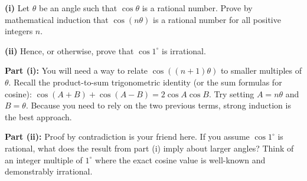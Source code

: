\begin{problem}
\textbf{(i)} Let $\theta$ be an angle such that $\cos \theta$ is a rational number. Prove by mathematical induction that $\cos(n\theta)$ is a rational number for all positive integers $n$.

\vspace{10pt}

\textbf{(ii)} Hence, or otherwise, prove that $\cos 1^\circ$ is irrational.
\end{problem}

\begin{hint}
\textbf{Part (i):} You will need a way to relate $\cos((n+1)\theta)$ to smaller multiples of $\theta$. Recall the product-to-sum trigonometric identity (or the sum formulas for cosine): $\cos(A+B) + \cos(A-B) = 2\cos A \cos B$. Try setting $A = n\theta$ and $B = \theta$. Because you need to rely on the two previous terms, strong induction is the best approach.

\textbf{Part (ii):} Proof by contradiction is your friend here. If you assume $\cos 1^\circ$ is rational, what does the result from part (i) imply about larger angles? Think of an integer multiple of $1^\circ$ where the exact cosine value is well-known and demonstrably irrational.
\end{hint}

